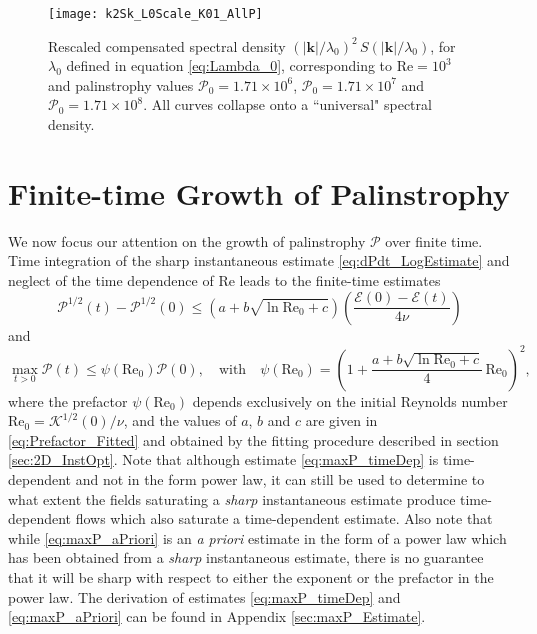 \documentclass[11pt]{article}
\def\E{{\mathcal{E}}}
\def\P{{\mathcal{P}}}
\def\K{{\mathcal{K}}}
\newcommand{\kvec}{\mathbf{k}}
\newcommand{\Reyn}{\textrm{Re}}
\begin{document}
\begin{figure}
\linespread{1.1}
\begin{center}
\texttt{[image: k2Sk\_L0Scale\_K01\_AllP]}
\caption[Spectral density]{Rescaled compensated spectral density $\left(|\kvec| / \lambda_0 \right)^2 \, S (|\kvec| / \lambda_0)$, for $\lambda_0$ defined in equation \eqref{eq:Lambda_0}, corresponding to $\Reyn = 10^3$ and palinstrophy values $\P_0 = 1.71\times 10^6$, $\P_0 = 1.71\times 10^7$ and $\P_0 = 1.71\times 10^8$. All curves collapse onto a ``universal" spectral density. }
\label{fig:Sk_vsP}
\end{center}
\end{figure}


\section{Finite-time Growth of Palinstrophy}
\label{sec:TimeEvol}

We now focus our attention on the growth of palinstrophy $\P$ over finite time. Time integration of the sharp instantaneous estimate \eqref{eq:dPdt_LogEstimate} and neglect of the time dependence of $\Reyn$ leads to the finite-time estimates 
\begin{equation}\label{eq:maxP_timeDep}
\P^{1/2}(t) - \P^{1/2}(0)  \leq \left( a + b\sqrt{\ln\Reyn_0 + c} \right)\left(\frac{\E(0) - \E(t)}{4\nu}\right)
\end{equation}
and
\begin{equation}\label{eq:maxP_aPriori}
\mathop{\max}_{t>0} \P(t) \leq \psi(\Reyn_0)\P(0), \quad\mbox{with}\quad
\psi(\Reyn_0) = \left(1+ \frac{a + b\sqrt{\ln\Reyn_0 + c}}{4} \,\Reyn_0\right)^2,
\end{equation}
where the prefactor $\psi(\Reyn_0)$ depends exclusively on the initial Reynolds number $\Reyn_0 = \K^{1/2}(0)/\nu$, and the values of $a$, $b$ and $c$ are given in \eqref{eq:Prefactor_Fitted} and obtained by the fitting procedure described in section \ref{sec:2D_InstOpt}. Note that although estimate \eqref{eq:maxP_timeDep} is time-dependent and not in the form power law, it can still be used to determine to what extent the fields saturating a \emph{sharp} instantaneous estimate produce time-dependent flows which also saturate a time-dependent estimate. Also note that while \eqref{eq:maxP_aPriori} is an \emph{a priori} estimate in the form of a power law  which has been obtained from a \emph{sharp} instantaneous estimate, there is no guarantee that it will be sharp with respect to either the exponent or the prefactor in the power law. The derivation of estimates \eqref{eq:maxP_timeDep} and \eqref{eq:maxP_aPriori} can be found in Appendix \ref{sec:maxP_Estimate}.
\end{document}
